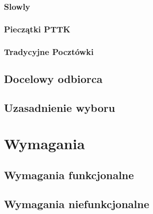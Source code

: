 \documentclass[a4paper,twoside,12pt]{book}
\begin{document}
\subsection{Slowly}


\subsection{Pieczątki PTTK}


\subsection{Tradycyjne Pocztówki}


\section{Docelowy odbiorca}


\section{Uzasadnienie wyboru}






\chapter{Wymagania}
\label{ch:wymagania}

\section{Wymagania funkcjonalne}


\section{Wymagania niefunkcjonalne}
\end{document}
